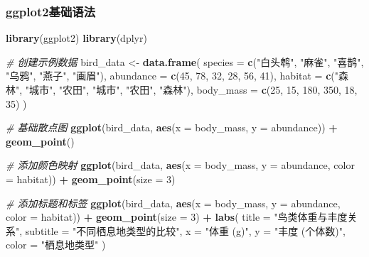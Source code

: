\documentclass[
  twoside]{book}
\newenvironment{Shaded}{\begin{snugshade}}{\end{snugshade}}
\newcommand{\AttributeTok}[1]{\textcolor[rgb]{0.13,0.29,0.53}{#1}}
\newcommand{\CommentTok}[1]{\textcolor[rgb]{0.56,0.35,0.01}{\textit{#1}}}
\newcommand{\DecValTok}[1]{\textcolor[rgb]{0.00,0.00,0.81}{#1}}
\newcommand{\FunctionTok}[1]{\textcolor[rgb]{0.13,0.29,0.53}{\textbf{#1}}}
\newcommand{\NormalTok}[1]{#1}
\newcommand{\OtherTok}[1]{\textcolor[rgb]{0.56,0.35,0.01}{#1}}
\newcommand{\SpecialCharTok}[1]{\textcolor[rgb]{0.81,0.36,0.00}{\textbf{#1}}}
\newcommand{\StringTok}[1]{\textcolor[rgb]{0.31,0.60,0.02}{#1}}
\begin{document}
\hypertarget{ggplot2ux57faux7840ux8bedux6cd5}{%
\subsubsection{ggplot2基础语法}\label{ggplot2ux57faux7840ux8bedux6cd5}}

\begin{Shaded}
\begin{Highlighting}[]
\FunctionTok{library}\NormalTok{(ggplot2)}
\FunctionTok{library}\NormalTok{(dplyr)}

\CommentTok{\# 创建示例数据}
\NormalTok{bird\_data }\OtherTok{\textless{}{-}} \FunctionTok{data.frame}\NormalTok{(}
  \AttributeTok{species =} \FunctionTok{c}\NormalTok{(}\StringTok{"白头鹎"}\NormalTok{, }\StringTok{"麻雀"}\NormalTok{, }\StringTok{"喜鹊"}\NormalTok{, }\StringTok{"乌鸦"}\NormalTok{, }\StringTok{"燕子"}\NormalTok{, }\StringTok{"画眉"}\NormalTok{),}
  \AttributeTok{abundance =} \FunctionTok{c}\NormalTok{(}\DecValTok{45}\NormalTok{, }\DecValTok{78}\NormalTok{, }\DecValTok{32}\NormalTok{, }\DecValTok{28}\NormalTok{, }\DecValTok{56}\NormalTok{, }\DecValTok{41}\NormalTok{),}
  \AttributeTok{habitat =} \FunctionTok{c}\NormalTok{(}\StringTok{"森林"}\NormalTok{, }\StringTok{"城市"}\NormalTok{, }\StringTok{"农田"}\NormalTok{, }\StringTok{"城市"}\NormalTok{, }\StringTok{"农田"}\NormalTok{, }\StringTok{"森林"}\NormalTok{),}
  \AttributeTok{body\_mass =} \FunctionTok{c}\NormalTok{(}\DecValTok{25}\NormalTok{, }\DecValTok{15}\NormalTok{, }\DecValTok{180}\NormalTok{, }\DecValTok{350}\NormalTok{, }\DecValTok{18}\NormalTok{, }\DecValTok{35}\NormalTok{)}
\NormalTok{)}

\CommentTok{\# 基础散点图}
\FunctionTok{ggplot}\NormalTok{(bird\_data, }\FunctionTok{aes}\NormalTok{(}\AttributeTok{x =}\NormalTok{ body\_mass, }\AttributeTok{y =}\NormalTok{ abundance)) }\SpecialCharTok{+}
  \FunctionTok{geom\_point}\NormalTok{()}

\CommentTok{\# 添加颜色映射}
\FunctionTok{ggplot}\NormalTok{(bird\_data, }\FunctionTok{aes}\NormalTok{(}\AttributeTok{x =}\NormalTok{ body\_mass, }\AttributeTok{y =}\NormalTok{ abundance, }\AttributeTok{color =}\NormalTok{ habitat)) }\SpecialCharTok{+}
  \FunctionTok{geom\_point}\NormalTok{(}\AttributeTok{size =} \DecValTok{3}\NormalTok{)}

\CommentTok{\# 添加标题和标签}
\FunctionTok{ggplot}\NormalTok{(bird\_data, }\FunctionTok{aes}\NormalTok{(}\AttributeTok{x =}\NormalTok{ body\_mass, }\AttributeTok{y =}\NormalTok{ abundance, }\AttributeTok{color =}\NormalTok{ habitat)) }\SpecialCharTok{+}
  \FunctionTok{geom\_point}\NormalTok{(}\AttributeTok{size =} \DecValTok{3}\NormalTok{) }\SpecialCharTok{+}
  \FunctionTok{labs}\NormalTok{(}
    \AttributeTok{title =} \StringTok{"鸟类体重与丰度关系"}\NormalTok{,}
    \AttributeTok{subtitle =} \StringTok{"不同栖息地类型的比较"}\NormalTok{,}
    \AttributeTok{x =} \StringTok{"体重 (g)"}\NormalTok{,}
    \AttributeTok{y =} \StringTok{"丰度 (个体数)"}\NormalTok{,}
    \AttributeTok{color =} \StringTok{"栖息地类型"}
\NormalTok{  )}
\end{Highlighting}
\end{Shaded}
\end{document}
